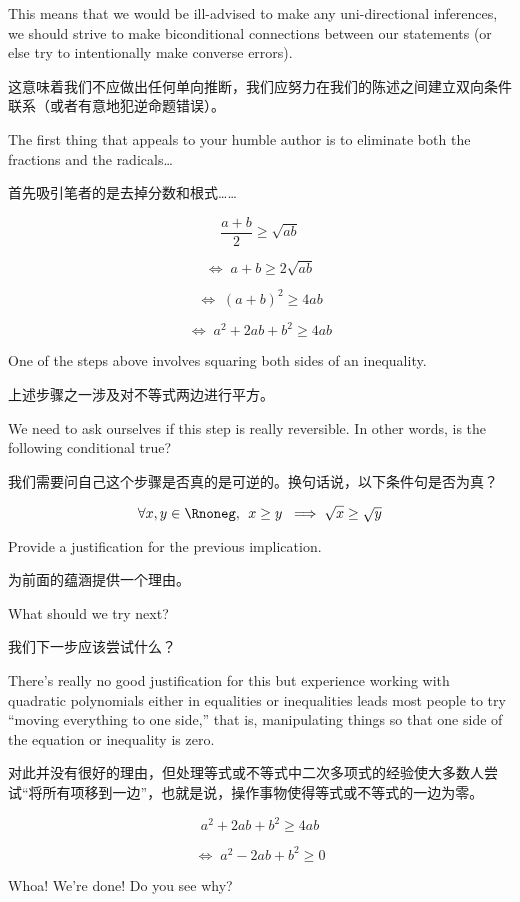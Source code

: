 This means that we would 
be ill-advised to make any uni-directional inferences, we should 
strive to make biconditional connections between our statements
(or else try to intentionally make converse errors).

这意味着我们不应做出任何单向推断，我们应努力在我们的陈述之间建立双向条件联系（或者有意地犯逆命题错误）。

The first thing that appeals to your humble author is to eliminate
both the fractions and the radicals\ldots

首先吸引笔者的是去掉分数和根式……

\[ \frac{a+b}{2} \geq \sqrt{ab} \]

\[ \iff \; a+b \geq 2\sqrt{ab} \]

\[ \iff \; (a+b)^2 \geq 4ab \] 

\[ \iff \; a^2+2ab+b^2 \geq 4ab \] 

One of the steps above involves squaring both sides of an inequality.

上述步骤之一涉及对不等式两边进行平方。

We need to ask ourselves if this step is really reversible.  In other
words, is the following conditional true?

我们需要问自己这个步骤是否真的是可逆的。换句话说，以下条件句是否为真？

\[ \forall x,y \in \Rnoneg, \, \; 
x \geq y \; \implies \sqrt{x} \geq \sqrt{y} \]

\begin{exer} 
Provide a justification for the previous implication.

为前面的蕴涵提供一个理由。
\end{exer}

What should we try next?

我们下一步应该尝试什么？

There's really no good justification for
this but experience working with quadratic polynomials either in 
equalities or inequalities leads most people to try ``moving everything
to one side,'' that is, manipulating things so that one side of the 
equation or inequality is zero.

对此并没有很好的理由，但处理等式或不等式中二次多项式的经验使大多数人尝试“将所有项移到一边”，也就是说，操作事物使得等式或不等式的一边为零。

\[  a^2+2ab+b^2 \geq 4ab \] 

\[ \iff \; a^2-2ab+b^2 \geq 0 \] 

Whoa!  We're done!  Do you see why?

